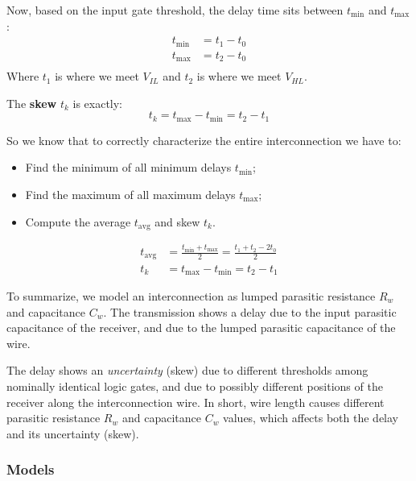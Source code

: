 \documentclass[a4paper,11pt]{article}
\begin{document}
Now, based on the input gate threshold, the delay time sits between $t_\text{min}$ and $t_\text{max}$:
$$
	\begin{aligned}
		t_\text{min} & = t_1 - t_0 \\
		t_\text{max} & = t_2 - t_0 \\
	\end{aligned}
$$
Where $t_1$ is where we meet $V_{IL}$ and $t_2$ is where we meet $V_{HL}$.

The \textbf{skew} $t_k$ is exactly:
$$
	t_k = t_\text{max} - t_\text{min} = t_2 - t_1
$$

So we know that to correctly characterize the entire interconnection we have to:
\begin{itemize}
	\item Find the minimum of all minimum delays $t_\text{min}$;
	\item Find the maximum of all maximum delays $t_\text{max}$;
	\item Compute the average $t_\text{avg}$ and skew $t_k$.
\end{itemize}
$$
	\begin{aligned}
		t_\text{avg} & = \frac{t_\text{min} + t_\text{max}}{2} = \frac{t_1 + t_2 - 2 t_0}{2} \\
		t_k          & = t_\text{max} - t_\text{min} = t_2 - t_1
	\end{aligned}
$$

To summarize, we model an interconnection as lumped parasitic resistance $R_w$ and capacitance $C_w$.
The transmission shows a delay due to the input parasitic capacitance of the receiver, and due to the lumped parasitic capacitance of the wire.

The delay shows an \textit{uncertainty} (skew) due to different thresholds among nominally identical logic gates, and due to possibly different positions of the receiver along the interconnection wire.
In short, wire length causes different parasitic resistance $R_w$ and capacitance $C_w$ values, which affects both the delay and its uncertainty (skew).

\subsubsection{Models}
\end{document}
